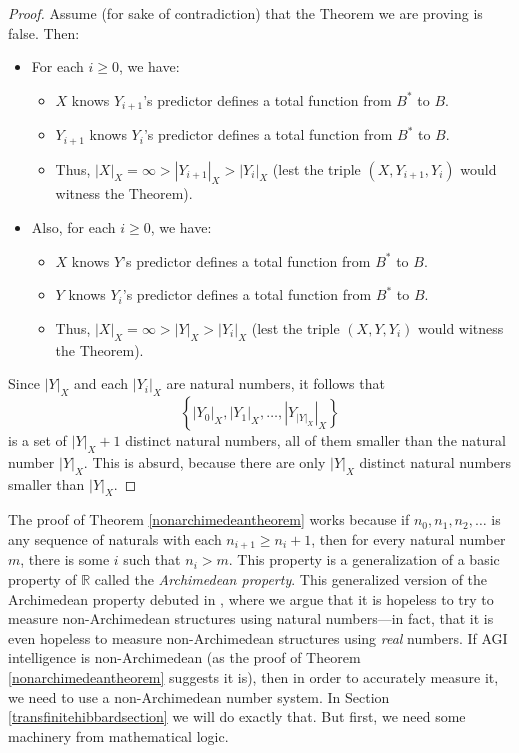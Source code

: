 \documentclass{article}
\begin{document}
\begin{proof}
    Assume (for sake of contradiction) that the Theorem we are proving is false.
    Then:
    \begin{itemize}
        \item
        For each $i\geq 0$, we have:
        \begin{itemize}
            \item
            $X$ knows $Y_{i+1}$'s predictor defines a total function from $B^*$ to $B$.
            \item
            $Y_{i+1}$ knows $Y_i$'s predictor defines a total function from $B^*$ to $B$.
            \item
            Thus, $|X|_X=\infty>|Y_{i+1}|_X>|Y_i|_X$ (lest the triple $(X,Y_{i+1},Y_i)$
            would witness the Theorem).
        \end{itemize}
        \item
        Also, for each $i\geq 0$, we have:
        \begin{itemize}
            \item
            $X$ knows $Y$'s predictor defines a total function from $B^*$ to $B$.
            \item
            $Y$ knows $Y_i$'s predictor defines a total function from $B^*$ to $B$.
            \item
            Thus, $|X|_X=\infty>|Y|_X>|Y_i|_X$ (lest the triple $(X,Y,Y_i)$
            would witness the Theorem).
        \end{itemize}
    \end{itemize}
    Since $|Y|_X$ and each $|Y_i|_X$ are natural numbers, it follows that
    \[
        \left\{|Y_0|_X,|Y_1|_X,\ldots,\left|Y_{|Y|_X}\right|_X\right\}
    \]
    is a set of $|Y|_X+1$ distinct natural numbers,
    all of them smaller than the natural number $|Y|_X$.
    This is absurd, because there are only $|Y|_X$ distinct natural numbers
    smaller than $|Y|_X$.
\end{proof}

The proof of Theorem \ref{nonarchimedeantheorem} works because if $n_0,n_1,n_2,\ldots$
is any sequence of naturals with each $n_{i+1}\geq n_i+1$, then for every natural number
$m$, there is some $i$ such that $n_i>m$. This property is a generalization of a
basic property of $\mathbb R$ called the \emph{Archimedean property}. This generalized
version of the Archimedean property debuted in \cite{alexander2020archimedean},
where we argue that it is hopeless to try to measure non-Archimedean structures
using natural numbers---in fact, that it is even hopeless to measure non-Archimedean
structures using \emph{real} numbers. If AGI intelligence is non-Archimedean (as the
proof of Theorem \ref{nonarchimedeantheorem} suggests it is), then in order to
accurately measure it, we need to use a non-Archimedean number system.
In Section \ref{transfinitehibbardsection}
we will do exactly that. But first, we need some machinery from mathematical logic.
\end{document}
